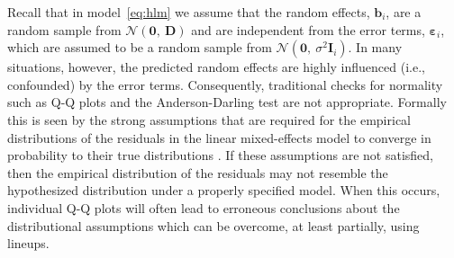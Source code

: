 \documentclass[12pt]{article} %
\begin{document}


Recall that in model~\eqref{eq:hlm} we assume that the random effects, $\bm{b}_i$, are a random sample from $\mathcal{N}(\bm{0},\ \bm{D})$ and are independent from the error terms, $\bm{\varepsilon}_i$, which are assumed to be a random sample from $\mathcal{N}(\bm{0},\ \sigma^2 \bm{I}_i)$. In many situations, however, the predicted random effects are highly influenced (i.e., confounded) by the error terms. Consequently, traditional checks for normality such as Q-Q plots and the Anderson-Darling test are not appropriate. 
Formally this is seen by the
strong assumptions that are required for the empirical distributions of the residuals in the linear mixed-effects model to converge in probability to their true distributions \citep[Theorem 3.2 and Lemma 3.1]{Jiang:1998vt}. If these assumptions are not satisfied, then the empirical distribution of the residuals may not resemble the hypothesized distribution under a properly specified model. When this occurs, individual Q-Q plots will often lead to erroneous conclusions about the distributional assumptions which can be overcome, at least partially, using lineups.
\end{document}
